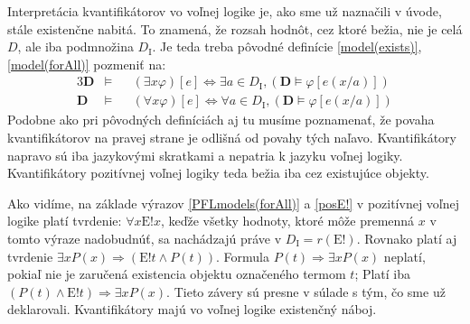\documentclass[12pt, letterpaper]{article}
\begin{document}
Interpretácia kvantifikátorov vo voľnej logike je, ako sme už naznačili v úvode, stále existenčne nabitá. To znamená, že rozsah hodnôt, cez ktoré bežia, nie je celá $D$, ale iba podmnožina $D_{\text{I}}$. Je teda treba pôvodné definície \ref{model(exists)}, \ref{model(forAll)} pozmeniť na: 
\begin{alignat}{3}
    \mathbf{D} &\models&& (\exists x\varphi)[e] \iff \exists a \in D_{\text{I}}, (\mathbf{D} \models \varphi[e(x/a)])  \label{PFLmodels(exists)}\\
	\mathbf{D} &\models&& (\forall x\varphi)[e] \iff \forall a \in D_{\text{I}}, (\mathbf{D} \models \varphi[e(x/a)])	\label{PFLmodels(forAll)}
\end{alignat}
\noindent Podobne ako pri pôvodných definíciách aj tu musíme poznamenať, že povaha kvantifikátorov na pravej strane je odlišná od povahy tých naľavo. Kvantifikátory napravo sú iba jazykovými skratkami a nepatria k jazyku voľnej logiky. Kvantifikátory pozitívnej voľnej logiky teda bežia iba cez existujúce objekty.\par



Ako vidíme, na základe výrazov \ref{PFLmodels(forAll)} a \ref{posE!} v pozitívnej voľnej logike platí tvrdenie: $\forall x \text{E}!x$, keďže všetky hodnoty, ktoré môže premenná $x$ v tomto výraze nadobudnúť, sa nachádzajú práve v $D_{\text{I}} = r(\text{E}!)$. Rovnako platí aj tvrdenie $\exists x P(x) \Rightarrow (\text{E}!t \land P(t))$. Formula $P(t) \Rightarrow \exists x P(x)$ neplatí, pokiaľ nie je zaručená existencia objektu označeného termom $t$; Platí iba $(P(t) \land \text{E}!t)\Rightarrow \exists x P(x)$. Tieto závery sú presne v súlade s tým, čo sme už deklarovali. Kvantifikátory majú vo voľnej logike existenčný náboj.\par
\end{document}
